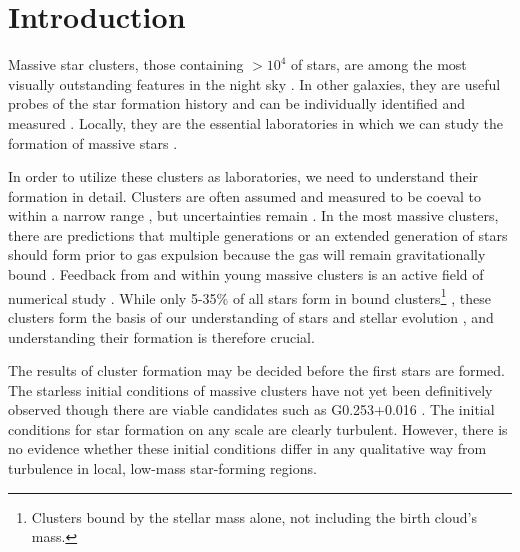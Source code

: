 \maketitle

\section{Introduction}

Massive star clusters, those containing $>10^4$ \msun of stars, are among the
most visually outstanding features in the night sky \citep[see review
by][]{Longmore2014a}.  In other galaxies, they
are useful probes of the star formation history and can be individually
identified and measured \citep{Bastian2008a}.  Locally, they are the essential
laboratories in which we can study the formation of massive stars
\citep{Davies2012a}.

In order to utilize these clusters as laboratories, we need to understand their
formation in detail.  Clusters are often assumed and measured to be coeval
to within a narrow range \citep[e.g. $10^5$ yr;][]{Kudryavtseva2012a},
but uncertainties remain \citep{Beccari2010a}.
In the most massive clusters, there are predictions that multiple generations
or an extended generation of stars should form prior to gas expulsion because
the gas will remain gravitationally bound \citep{Bressert2012a}.   Feedback from
and within young massive clusters is an active field of numerical study
\citep{Rogers2013a,Dale2013a,Dale2012a,Dale2008a,Dale2005a,Parker2013a,Myers2014a,Krumholz2014a}.
While
only 5-35\% of all stars form in bound clusters\footnote{Clusters bound by the
stellar mass alone, not including the birth cloud's mass.}
\citep{Kruijssen2012a}, these clusters form the basis of our understanding of
stars and stellar evolution
\citep{Kalirai2010a}, and understanding their formation is therefore crucial.

The results of cluster formation may be decided before the first stars are
formed.  The starless initial conditions of massive clusters have not yet been
definitively observed \citep{Ginsburg2012a} though there are viable candidates
such as G0.253+0.016 \citep{Longmore2012b}.  The initial conditions for star
formation on any scale are clearly turbulent.  However, there is no evidence
whether these initial conditions differ in any qualitative way from turbulence
in local, low-mass star-forming regions.

